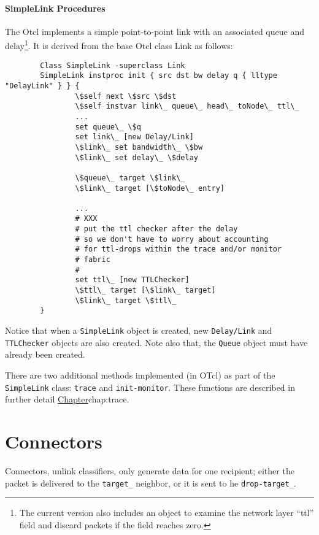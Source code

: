 \paragraph{SimpleLink Procedures}
The Otcl 
implements a simple point-to-point
link with an associated queue and delay\footnote{The current
version also includes an object to examine the
network layer ``ttl'' field and discard packets if the
field reaches zero.}.
It is derived from the base Otcl class Link as follows:
\begin{verbatim}
        Class SimpleLink -superclass Link
        SimpleLink instproc init { src dst bw delay q { lltype "DelayLink" } } {
                \$self next \$src \$dst
                \$self instvar link\_ queue\_ head\_ toNode\_ ttl\_
                ...
                set queue\_ \$q
                set link\_ [new Delay/Link]
                \$link\_ set bandwidth\_ \$bw
                \$link\_ set delay\_ \$delay

                \$queue\_ target \$link\_
                \$link\_ target [\$toNode\_ entry]

                ...
                # XXX
                # put the ttl checker after the delay
                # so we don't have to worry about accounting
                # for ttl-drops within the trace and/or monitor
                # fabric
                #
                set ttl\_ [new TTLChecker]
                \$ttl\_ target [\$link\_ target]
                \$link\_ target \$ttl\_
        }
\end{verbatim}
Notice that when a {\tt SimpleLink} object is created,
new {\tt Delay/Link} and {\tt TTLChecker} objects are
also created.
Note also that,
the {\tt Queue} object must have already been created.

There are two additional methods implemented (in OTcl) as part
of the {\tt SimpleLink} class: {\tt trace} and {\tt init-monitor}.
These functions are described in further detail
\href{in the section on tracing}{Chapter}{chap:trace}. 

\section{Connectors}
\label{sec:links:connectors}

Connectors, unlink  classifiers, only generate data for one recipient;
either the packet is delivered to the {\tt target\_} neighbor, or it
is sent to he {\tt drop-target\_}.

